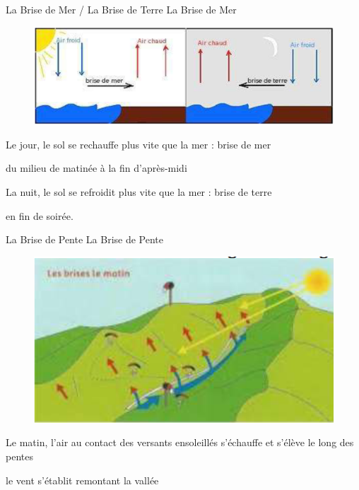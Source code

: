 \documentclass{beamer}
\begin{document}
\begin{frame}{La Brise de Mer / La Brise de Terre}
  La Brise de Mer
  \pause
  
  \begin{figure}
    \centering
    \includegraphics[scale=1]{images/brise-mer.png}
  \end{figure}

  \pause
  Le jour, le sol se rechauffe plus vite que la mer : brise de mer

  \pause du milieu de matinée à la fin d'après-midi

  \pause
  La nuit, le sol se refroidit plus vite que la mer : brise de terre

  \pause en fin de soirée.

\end{frame}

\begin{frame}{La Brise de Pente}
  La Brise de Pente
  \pause
  

  \begin{figure}
    \centering
    \includegraphics[scale=1]{images/brise-montagne-matin.png}
  \end{figure}

  \pause
  Le matin, l'air au contact des versants ensoleillés s'échauffe et s'élève le long des pentes

  \pause le vent s'établit remontant la vallée

\end{frame}
\end{document}
